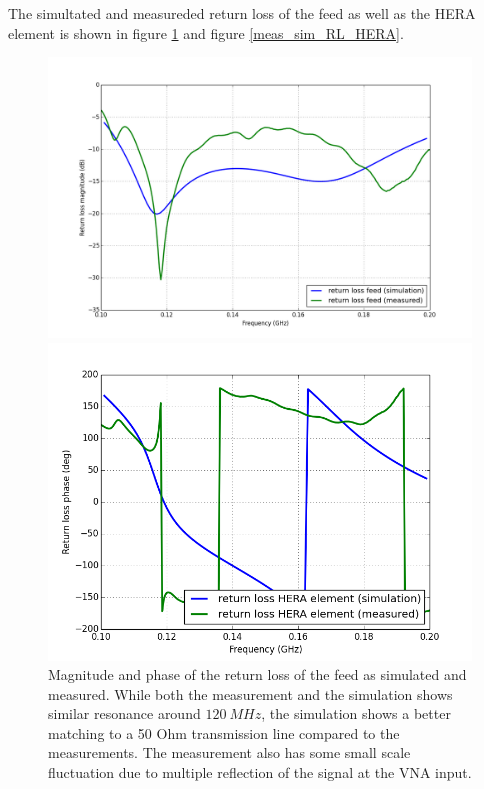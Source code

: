 \documentclass[twocolumn]{emulateapj}
\begin{document}
The simultated and measureded return loss of the feed as well as the HERA element is shown in figure \ref{meas_sim_RL_feed} and figure \ref{meas_sim_RL_HERA}.
\begin{figure}[ht]
\begin{minipage}[b]{\linewidth}
\centering
\includegraphics[angle=0, width=\linewidth]{plots/feed_meas_sim_mag.png}
\end{minipage}
\vspace{0.1cm}
\begin{minipage}[b]{\linewidth}
\centering
\includegraphics[angle=0, width=\linewidth]{plots/feed_meas_sim_ph.png}
\end{minipage}
\caption{Magnitude and phase of the return loss of the feed as simulated and measured. While both the measurement and the simulation shows similar resonance around $120~MHz$, the simulation shows a better matching to a 50 Ohm transmission line compared to the measurements. The measurement also has some small scale fluctuation due to multiple reflection of the signal at the VNA input. }   
\label{meas_sim_RL_feed}
\end{figure}
\end{document}
